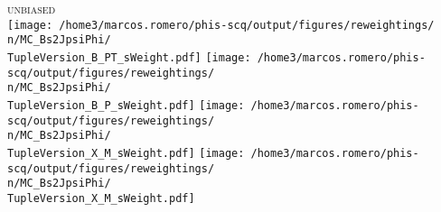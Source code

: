 {\begin{frame}
\vspace*{0.25cm}
\centering \textsc{unbiased}\\[0.15cm]
  \texttt{[image: /home3/marcos.romero/phis-scq/output/figures/reweightings/\\n/MC\_Bs2JpsiPhi/\\TupleVersion\_B\_PT\_sWeight.pdf]}
  \texttt{[image: /home3/marcos.romero/phis-scq/output/figures/reweightings/\\n/MC\_Bs2JpsiPhi/\\TupleVersion\_B\_P\_sWeight.pdf]}
  \texttt{[image: /home3/marcos.romero/phis-scq/output/figures/reweightings/\\n/MC\_Bs2JpsiPhi/\\TupleVersion\_X\_M\_sWeight.pdf]}
  \texttt{[image: /home3/marcos.romero/phis-scq/output/figures/reweightings/\\n/MC\_Bs2JpsiPhi/\\TupleVersion\_X\_M\_sWeight.pdf]}

\end{frame} %
%
}

